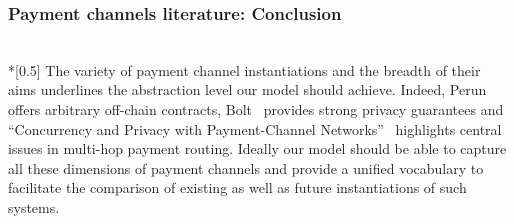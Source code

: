 \subsubsection{Payment channels literature: Conclusion} \ \\*[0.5\baselineskip]
  The variety of payment channel instantiations and the breadth of their aims underlines
  the abstraction level our model should achieve. Indeed, Perun~\cite{perun} offers
  arbitrary off-chain contracts, Bolt~\cite{bolt} provides strong privacy guarantees and
  ``Concurrency and Privacy with Payment-Channel Networks''~\cite{fulgorrayo} highlights
  central issues in multi-hop payment routing. Ideally our model should be able to capture
  all these dimensions of payment channels and provide a unified vocabulary to facilitate
  the comparison of existing as well as future instantiations of such systems.
